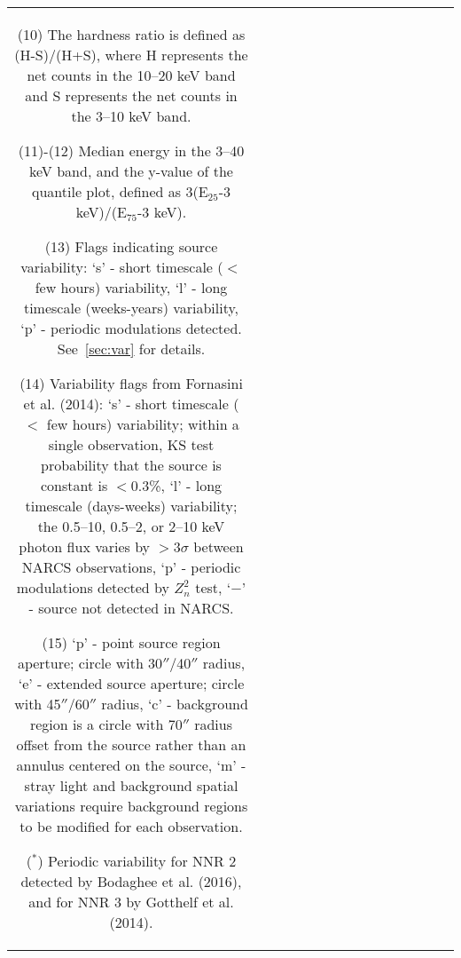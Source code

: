 \documentclass[iop,revtex4]{emulateapj}
\begin{document}
\begin{landscape}
{\begin{longtable}{ccccccccccccp{0.25in}p{0.25in}c}
{(10) The hardness ratio is defined as (H-S)/(H+S), where H represents the net counts in the 10--20 keV band and S represents the net counts in the 3--10 keV band. 

(11)-(12) Median energy in the 3--40 keV band, and the y-value of the quantile plot, defined as 3(E$_{25}$-3 keV)/(E$_{75}$-3 keV). 

(13) Flags indicating source variability: `s' - short timescale ($<$ few hours) variability, `l' - long timescale (weeks-years) variability, `p' - periodic modulations detected.  See~\ref{sec:var} for details.

(14) Variability flags from Fornasini et al. (2014): `s' - short timescale ($<$ few hours) variability; within a single observation, KS test probability that the source is constant is $<0.3$\%, `l' - long timescale (days-weeks) variability; the 0.5--10, 0.5--2, or 2--10 keV photon flux varies by $>3\sigma$ between NARCS observations, `p' - periodic modulations detected by $Z_n^2$ test, `$-$' - source not detected in NARCS. 

(15) `p' - point source region aperture; circle with 30$''$/40$''$ radius, `e' - extended source aperture; circle with 45$''$/60$''$ radius, `c' - background region is a circle with 70$''$ radius offset from the source rather than an annulus centered on the source, `m' - stray light and background spatial variations require background regions to be modified for each observation.

($^*$) Periodic variability for NNR 2 detected by Bodaghee et al. (2016), and for NNR 3 by Gotthelf et al. (2014). 
}
\label{tab:phot}
\end{longtable}}
\newpage



\end{landscape}
\end{document}
